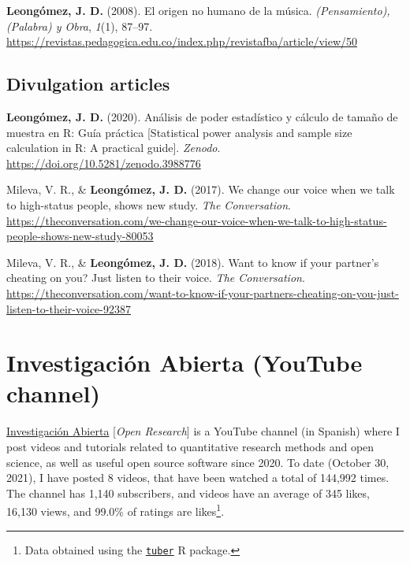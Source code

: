 \documentclass[11pt, a4paper]{awesome-cv}
\begin{document}
\leavevmode{}%
\textbf{Leongómez, J. D.} (2008). {El origen no humano de la m{ú}sica}.
\emph{(Pensamiento), (Palabra) y Obra}, \emph{1}(1), 87--97.
\url{https://revistas.pedagogica.edu.co/index.php/revistafba/article/view/50}

\endgroup

\hypertarget{section-2}{%
\subsection{\texorpdfstring{\textbf{Divulgation articles}}{}}\label{section-2}}

\begingroup
\setlength{\parindent}{-0.5in}
\setlength{\leftskip}{0.5in}

\hypertarget{refs_divulgation}{}
\leavevmode{}%
\textbf{Leongómez, J. D.} (2020). {Análisis de poder estadístico y
cálculo de tamaño de muestra en R: Guía práctica {[}Statistical power
analysis and sample size calculation in R: A practical guide{]}}.
\emph{Zenodo}. \url{https://doi.org/10.5281/zenodo.3988776}

\leavevmode{}%
Mileva, V. R., \& \textbf{Leongómez, J. D.} (2017). {We change our voice
when we talk to high-status people, shows new study}. \emph{The
Conversation}.
\url{https://theconversation.com/we-change-our-voice-when-we-talk-to-high-status-people-shows-new-study-80053}

\leavevmode{}%
Mileva, V. R., \& \textbf{Leongómez, J. D.} (2018). {Want to know if
your partner's cheating on you? Just listen to their voice}. \emph{The
Conversation}.
\url{https://theconversation.com/want-to-know-if-your-partners-cheating-on-you-just-listen-to-their-voice-92387}

\endgroup

\hypertarget{investigaciuxf3n-abierta-youtube-channel}{%
\section{Investigación Abierta (YouTube
channel)}\label{investigaciuxf3n-abierta-youtube-channel}}

\href{https://www.youtube.com/c/InvestigaciónAbierta}{\textcolor{red}{\faYoutubePlay}
Investigación Abierta} {[}\textit{Open Research}{]} is a YouTube channel
(in Spanish) where I post videos and tutorials related to quantitative
research methods and open science, as well as useful open source
software since 2020. To date (October 30, 2021), I have posted 8 videos,
that have been watched a total of 144,992 times. The channel has 1,140
subscribers, and videos have an average of 345 likes, 16,130 views, and
99.0\% of ratings are likes\footnote{Data obtained using the
  \href{https://cran.r-project.org/web/packages/tuber/index.html}{\texttt{tuber}}
  R package.}.
\end{document}
